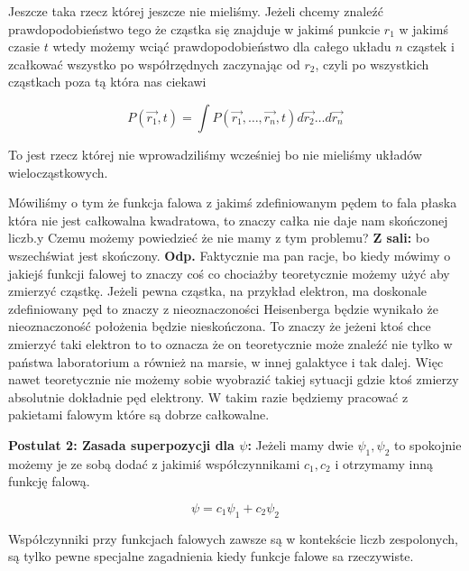 Jeszcze taka rzecz której jeszcze nie mieliśmy. Jeżeli chcemy znaleźć prawdopodobieństwo tego że cząstka się znajduje w jakimś punkcie $r_1$ w jakimś czasie $t$ wtedy możemy wciąć prawdopodobieństwo dla całego układu $n$ cząstek i zcałkować wszystko po współrzędnych zaczynając od $r_2$, czyli po wszystkich cząstkach poza tą która nas ciekawi

\begin{equation*}
	P(\vec{r_1}, t) = \int P (\vec{r_1}, \dots, \vec{r_n}, t) d\vec{r_2}\dots d\vec{r_n}
\end{equation*}

To jest rzecz której nie wprowadziliśmy wcześniej bo nie mieliśmy układów wielocząstkowych.

Mówiliśmy o tym że funkcja falowa z jakimś zdefiniowanym pędem to fala płaska która nie jest całkowalna kwadratowa, to znaczy całka nie daje nam skończonej liczb.y Czemu możemy powiedzieć że nie mamy z tym problemu? \textbf{Z sali:} bo wszechświat jest skończony. \textbf{Odp.} Faktycznie ma pan racje, bo kiedy mówimy o jakiejś funkcji falowej to znaczy coś co chociażby teoretycznie możemy użyć aby zmierzyć cząstkę. Jeżeli pewna cząstka, na przykład elektron, ma doskonale zdefiniowany pęd to znaczy z nieoznaczoności Heisenberga będzie wynikało że nieoznaczoność położenia będzie nieskończona. To znaczy że jeżeni ktoś chce zmierzyć taki elektron to to oznacza że on teoretycznie może znaleźć nie tylko w państwa laboratorium a również na marsie, w innej galaktyce i tak dalej. Więc nawet teoretycznie nie możemy sobie wyobrazić takiej sytuacji gdzie ktoś zmierzy absolutnie dokładnie pęd elektrony. W takim razie będziemy pracować z pakietami falowym które są dobrze całkowalne.

\textbf{Postulat 2: Zasada superpozycji dla $\psi$:} Jeżeli mamy dwie $\psi_1, \psi_2$ to spokojnie możemy je ze sobą dodać z jakimiś współczynnikami $c_1, c_2$ i otrzymamy inną funkcję falową. 

\begin{equation*}
	\psi = c_1 \psi_1 + c_2 \psi_2
\end{equation*}

Współczynniki przy funkcjach falowych zawsze są w kontekście liczb zespolonych, są tylko pewne specjalne zagadnienia kiedy funkcje falowe sa rzeczywiste.

